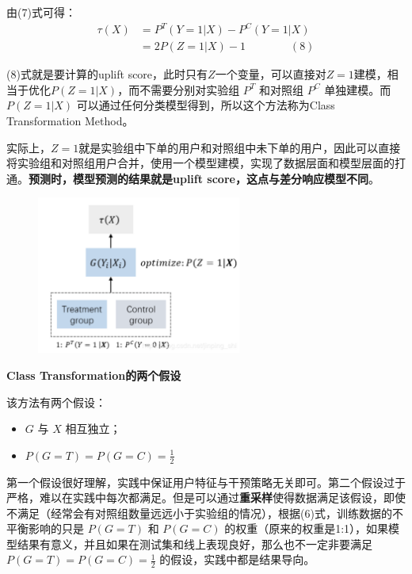 \documentclass[12pt]{article}
\begin{document}
由(7)式可得：
\begin{align*}
\tau(X) &= P^T(Y=1|X) - P^C(Y=1|X) \\
	&= 2P(Z=1|X) - 1 \qquad \qquad (8)
\end{align*}

(8)式就是要计算的uplift score，此时只有$Z$一个变量，可以直接对$Z=1$建模，相当于优化$P(Z=1|X)$，而不需要分别对实验组 $P^T$ 和对照组 $P^C$ 单独建模。而 $P(Z=1|X)$ 可以通过任何分类模型得到，所以这个方法称为Class Transformation Method。

实际上，$Z=1$就是实验组中下单的用户和对照组中未下单的用户，因此可以直接将实验组和对照组用户合并，使用一个模型建模，实现了数据层面和模型层面的打通。\textbf{预测时，模型预测的结果就是uplift score，这点与差分响应模型不同}。

\begin{figure}[H]
    \centering
    \includegraphics[width=0.6\textwidth]{fig/CasualInference-Uplift-Model-Class-Transformation.png}
\end{figure}

\begin{framed}
\textbf{Class Transformation的两个假设}

该方法有两个假设：
\begin{itemize}
\setlength{\itemsep}{0pt}
\setlength{\parsep}{0pt}
\setlength{\parskip}{0pt}
    \item $G$ 与 $X$ 相互独立；
    \item $P(G=T) = P(G = C) = \frac{1}{2}$
\end{itemize}

第一个假设很好理解，实践中保证用户特征与干预策略无关即可。第二个假设过于严格，难以在实践中每次都满足。但是可以通过\textbf{重采样}使得数据满足该假设，即使不满足（经常会有对照组数量远远小于实验组的情况），根据(6)式，训练数据的不平衡影响的只是 $P(G=T)$ 和 $P(G=C)$ 的权重（原来的权重是1:1），如果模型结果有意义，并且如果在测试集和线上表现良好，那么也不一定非要满足 $P(G=T) = P(G=C) = \frac{1}{2}$ 的假设，实践中都是结果导向。
\end{framed}
\end{document}
